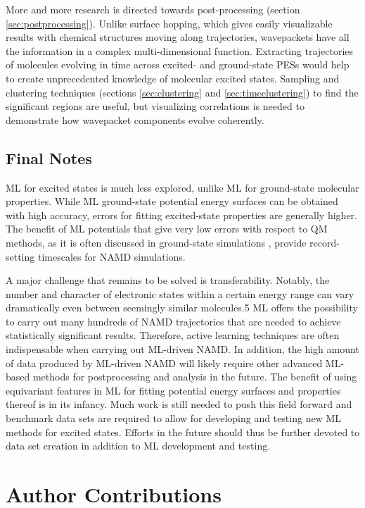 \documentclass[9pt,bestpractices]{livecoms}
\begin{document}
More and more research is directed towards post-processing (section \ref{sec:postprocessing}). Unlike surface hopping, which gives easily visualizable results with chemical structures moving along trajectories, wavepackets have all the information in a complex multi-dimensional function. Extracting trajectories of molecules evolving in time across excited- and ground-state PESs would help to create unprecedented knowledge of molecular excited states. Sampling and clustering techniques (sections \ref{sec:clustering} and \ref{sec:timeclustering}) to find the significant regions are useful, but visualizing correlations is needed to demonstrate how wavepacket components evolve coherently.

\subsection{Final Notes}

ML for excited states is much less explored, unlike ML for ground-state molecular properties. While ML ground-state potential energy surfaces can be obtained with high accuracy, errors for fitting excited-state properties are generally higher. The benefit of ML potentials that give very low errors with respect to QM methods, as it is often discussed in ground-state simulations \cite{RN127, RN95, Schutt21, RN126, RN93}, provide record-setting timescales for NAMD simulations.

A major challenge that remains to be solved is transferability. Notably, the number and character of electronic states within a certain energy range can vary dramatically even between seemingly similar molecules.5 ML offers the possibility to carry out many hundreds of NAMD trajectories that are needed to achieve statistically significant results. Therefore, active learning techniques are often indispensable when carrying out ML-driven NAMD. In addition, the high amount of data produced by ML-driven NAMD will likely require other advanced ML-based methods for postprocessing and analysis in the future. The benefit of using equivariant features in ML for fitting potential energy surfaces and properties thereof is in its infancy. Much work is still needed to push this field forward and benchmark data sets are required to allow for developing and testing new ML methods for excited states. Efforts in the future should thus be further devoted to data set creation in addition to ML development and testing. 



\section*{Author Contributions}
%
\end{document}
